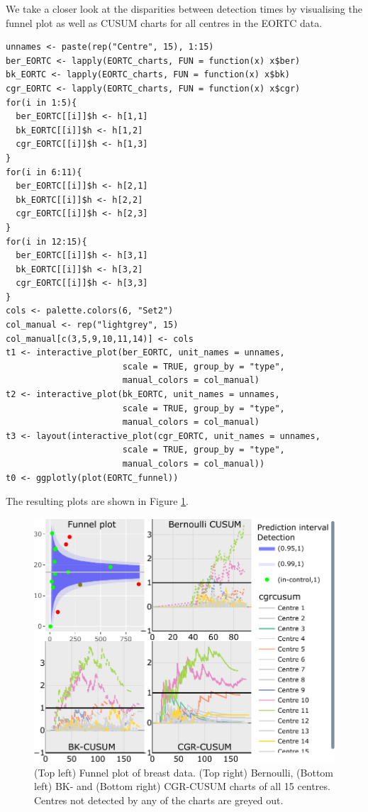 We take a closer look at the disparities between detection times by visualising the funnel plot as well as CUSUM charts for all centres in the EORTC data.

\begin{verbatim}
unnames <- paste(rep("Centre", 15), 1:15)
ber_EORTC <- lapply(EORTC_charts, FUN = function(x) x$ber)
bk_EORTC <- lapply(EORTC_charts, FUN = function(x) x$bk)
cgr_EORTC <- lapply(EORTC_charts, FUN = function(x) x$cgr)
for(i in 1:5){
  ber_EORTC[[i]]$h <- h[1,1] 
  bk_EORTC[[i]]$h <- h[1,2]
  cgr_EORTC[[i]]$h <- h[1,3]
}
for(i in 6:11){
  ber_EORTC[[i]]$h <- h[2,1] 
  bk_EORTC[[i]]$h <- h[2,2]
  cgr_EORTC[[i]]$h <- h[2,3]  
}
for(i in 12:15){
  ber_EORTC[[i]]$h <- h[3,1] 
  bk_EORTC[[i]]$h <- h[3,2]
  cgr_EORTC[[i]]$h <- h[3,3]  
}
cols <- palette.colors(6, "Set2")
col_manual <- rep("lightgrey", 15)
col_manual[c(3,5,9,10,11,14)] <- cols
t1 <- interactive_plot(ber_EORTC, unit_names = unnames, 
                       scale = TRUE, group_by = "type",
                       manual_colors = col_manual)
t2 <- interactive_plot(bk_EORTC, unit_names = unnames, 
                       scale = TRUE, group_by = "type",
                       manual_colors = col_manual)
t3 <- layout(interactive_plot(cgr_EORTC, unit_names = unnames, 
                       scale = TRUE, group_by = "type",
                       manual_colors = col_manual))
t0 <- ggplotly(plot(EORTC_funnel))
\end{verbatim}

The resulting plots are shown in Figure \ref{fig:funnelandcusums-static}.

\begin{figure}
\centering
\includegraphics{RJ-2023-095_files/figure-latex/funnelandcusums-static-1.pdf}
\caption{\label{fig:funnelandcusums-static}(Top left) Funnel plot of breast data. (Top right) Bernoulli, (Bottom left) BK- and (Bottom right) CGR-CUSUM charts of all 15 centres. Centres not detected by any of the charts are greyed out.}
\end{figure}

